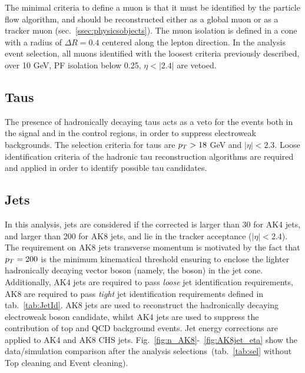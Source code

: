 The minimal criteria to define a muon is that it must be identified by the particle flow algorithm, and should be reconstructed either as a global muon or as a tracker muon (sec.~\ref{ssec:physicsobjects}). The muon isolation is defined in a cone with a radius of $\Delta R=0.4$ centered along the lepton direction. In the analysis event selection, all muons identified with the loosest criteria previously described, \pt over 10 GeV, PF isolation below 0.25, $\eta<|2.4|$ are vetoed.
 


\subsection{Taus}\label{ssec:tau}
The presence of hadronically decaying taus acts as a veto for the events both in the signal and in the control regions, in order to suppress electroweak backgrounds. The selection criteria for taus are $p_T > 18$ GeV and $|\eta| < 2.3$. Loose identification criteria of the hadronic tau reconstruction algorithms are required and applied in order to identify possible tau candidates.


\subsection{Jets}\label{ssec:jets}
In this analysis, jets are considered if the corrected \pt is larger than 30 \GeV for AK4 jets, and larger than 200 \GeV for AK8 jets, and lie in the tracker acceptance ($|\eta|<2.4$). The requirement on AK8 jets transverse momentum is motivated by the fact that $p_T = 200$ \GeV is the minimum kinematical threshold ensuring to enclose the lighter hadronically decaying vector boson (namely, the \W boson) in the jet cone. Additionally, AK4 jets are required to pass \emph{loose} jet identification requirements, AK8 are required to pass \emph{tight} jet identification requirements defined in tab.~\ref{tab:JetId}. AK8 jets are used to reconstruct the hadronically decaying electroweak boson candidate, whilst AK4 jets are used to suppress the contribution of top and QCD background events. Jet energy corrections are applied to AK4 and AK8 CHS jets. Fig.~\ref{fig:n_AK8}-~\ref{fig:AK8jet_eta} show the data/simulation comparison after the analysis selections~(tab.~\ref{tab:sel} without Top cleaning and Event cleaning).

